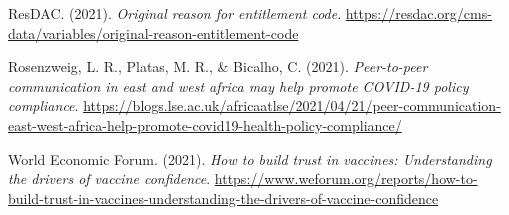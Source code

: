 \documentclass[
  12pt,
]{article}
\newlength{\cslhangindent}
\newlength{\cslentryspacingunit} %
\newenvironment{CSLReferences}[2] %
 {%
  \setlength{\parindent}{0pt}
  \ifodd #1
  \let\oldpar\par
  \def\par{\hangindent=\cslhangindent\oldpar}
  \fi
  \setlength{\parskip}{#2\cslentryspacingunit}
 }%
 {}
\begin{document}
\begin{CSLReferences}{1}{0}
\leavevmode{}%
ResDAC. (2021). \emph{Original reason for entitlement code}.
\url{https://resdac.org/cms-data/variables/original-reason-entitlement-code}

\leavevmode{}%
Rosenzweig, L. R., Platas, M. R., \& Bicalho, C. (2021).
\emph{Peer-to-peer communication in east and west africa may help
promote COVID-19 policy compliance}.
\url{https://blogs.lse.ac.uk/africaatlse/2021/04/21/peer-communication-east-west-africa-help-promote-covid19-health-policy-compliance/}

\leavevmode{}%
World Economic Forum. (2021). \emph{How to build trust in vaccines:
Understanding the drivers of vaccine confidence}.
\url{https://www.weforum.org/reports/how-to-build-trust-in-vaccines-understanding-the-drivers-of-vaccine-confidence}

\end{CSLReferences}
\end{document}
